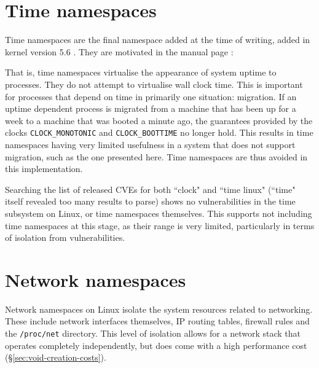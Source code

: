 \documentclass[12pt,a4paper,twoside]{report}
\begin{document}
\section{Time namespaces}
\label{sec:voiding-time}

Time namespaces are the final namespace added at the time of writing, added in kernel version 5.6 \citep{linux_kernel_newbies_editors_linux_2020}. They are motivated in the manual page \citep{free_software_foundation_time_namespaces7_2021}:


That is, time namespaces virtualise the appearance of system uptime to processes. They do not attempt to virtualise wall clock time. This is important for processes that depend on time in primarily one situation: migration. If an uptime dependent process is migrated from a machine that has been up for a week to a machine that was booted a minute ago, the guarantees provided by the clocks \texttt{CLOCK\_MONOTONIC} and \texttt{CLOCK\_BOOTTIME} no longer hold. This results in time namespaces having very limited usefulness in a system that does not support migration, such as the one presented here. Time namespaces are thus avoided in this implementation.

Searching the list of released CVEs for both ``clock" and ``time linux" (``time" itself revealed too many results to parse) shows no vulnerabilities in the time subsystem on Linux, or time namespaces themselves. This supports not including time namespaces at this stage, as their range is very limited, particularly in terms of isolation from vulnerabilities.

\section{Network namespaces}
\label{sec:voiding-net}

Network namespaces on Linux isolate the system resources related to networking. These include network interfaces themselves, IP routing tables, firewall rules and the \texttt{/proc/net} directory. This level of isolation allows for a network stack that operates completely independently, but does come with a high performance cost (§\ref{sec:void-creation-costs}).
\end{document}

